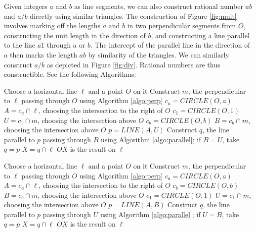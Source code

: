 Given integers $a$ and $b$ as line segments, we can also construct rational number $ab$ and $a/b$ directly using similar triangles. The construction of Figure \ref{fig:mult} involves marking off the lengths $a$ and $b$ in two perpendicular segments from $O$, constructing the unit length in the direction of $b$, and constructing a line parallel to the line $\overline{a1}$ through $a$ or $b$. The intercept of the parallel line in the direction of $a$ then marks  the length $ab$ by similarity of the triangles. We can similarly construct $a/b$ as depicted in Figure \ref{fig:div}. Rational numbers are thus constructible.  See the following Algorithms:

\begin{algorithm}
\begin{algorithmic}[1]
\State Choose a horizontal line $\ell$ and a point $O$ on it
\State Construct $m$, the perpendicular to $\ell$ passing
       through $O$ using Algorithm \ref{algo:perp}
\State $c_a = CIRCLE(O,a)$
\State $A = c_a \cap \ell$, choosing the intersection
       to the right of $O$
\State $c_1 = CIRCLE(O,1)$
\State $U = c_1 \cap m$, choosing the intersection
       above $O$
\State $c_b = CIRCLE(O,b)$
\State $B = c_b \cap m$, choosing the intersection
       above $O$
\State $p = LINE(A,U)$
\State Construct $q$, the line parallel to $p$ passing
       through $B$ using Algorithm \ref{algo:parallel};
       if $B=U$, take $q=p$
\State $X = q \cap \ell$
\State $\overline{OX}$ is the result on $\ell$
\EndProcedure
\end{algorithmic}
\caption{Constructing $ab$ given $a$ and $b$}
\label{algo:mult}
\end{algorithm}

\begin{algorithm}
\begin{algorithmic}[1]
\State Choose a horizontal line $\ell$ and a point $O$ on it
\State Construct $m$, the perpendicular to $\ell$ passing
       through $O$ using Algorithm \ref{algo:perp}
\State $c_a = CIRCLE(O,a)$
\State $A = c_a \cap \ell$, choosing the intersection
       to the right of $O$
\State $c_b = CIRCLE(O,b)$
\State $B = c_b \cap m$, choosing the intersection
       above $O$
\State $c_1 = CIRCLE(O,1)$
\State $U = c_1 \cap m$, choosing the intersection
       above $O$
\State $p = LINE(A,B)$
\State Construct $q$, the line parallel to $p$ passing
       through $U$ using Algorithm \ref{algo:parallel};
       if $U=B$, take $q=p$
\State $X = q \cap \ell$
\State $\overline{OX}$ is the result on $\ell$
\EndProcedure
\end{algorithmic}
\caption{Constructing $a/b$ given $a$ and $b$, $b>0$}
\label{algo:div}
\end{algorithm}

